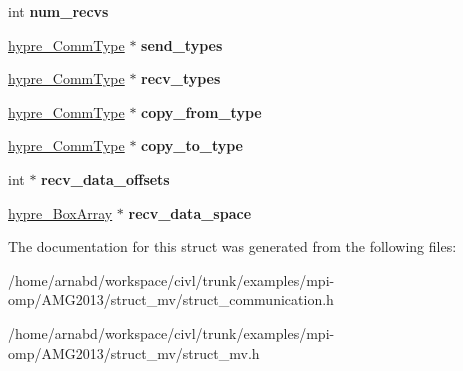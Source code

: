 \begin{DoxyCompactItemize}
\item 
\hypertarget{structhypre__CommPkg__struct_ad6ea2bee054ccc04654840324dd5136b}{}int {\bfseries num\+\_\+recvs}\label{structhypre__CommPkg__struct_ad6ea2bee054ccc04654840324dd5136b}

\item 
\hypertarget{structhypre__CommPkg__struct_a502ae18c7d9b6324891f60cf085dfe92}{}\hyperlink{structhypre__CommType__struct}{hypre\+\_\+\+Comm\+Type} $\ast$ {\bfseries send\+\_\+types}\label{structhypre__CommPkg__struct_a502ae18c7d9b6324891f60cf085dfe92}

\item 
\hypertarget{structhypre__CommPkg__struct_a1cf123ff7f70070ad42d258e8c6525ad}{}\hyperlink{structhypre__CommType__struct}{hypre\+\_\+\+Comm\+Type} $\ast$ {\bfseries recv\+\_\+types}\label{structhypre__CommPkg__struct_a1cf123ff7f70070ad42d258e8c6525ad}

\item 
\hypertarget{structhypre__CommPkg__struct_ad2a4994964bfb6b59caf59418ad10521}{}\hyperlink{structhypre__CommType__struct}{hypre\+\_\+\+Comm\+Type} $\ast$ {\bfseries copy\+\_\+from\+\_\+type}\label{structhypre__CommPkg__struct_ad2a4994964bfb6b59caf59418ad10521}

\item 
\hypertarget{structhypre__CommPkg__struct_af63c01b6c8c267ae6a28024355058869}{}\hyperlink{structhypre__CommType__struct}{hypre\+\_\+\+Comm\+Type} $\ast$ {\bfseries copy\+\_\+to\+\_\+type}\label{structhypre__CommPkg__struct_af63c01b6c8c267ae6a28024355058869}

\item 
\hypertarget{structhypre__CommPkg__struct_a4b8468a37cca38cd0172dea2f76fa22c}{}int $\ast$ {\bfseries recv\+\_\+data\+\_\+offsets}\label{structhypre__CommPkg__struct_a4b8468a37cca38cd0172dea2f76fa22c}

\item 
\hypertarget{structhypre__CommPkg__struct_ac61e7965e0ce364e91a5a47529a9942a}{}\hyperlink{structhypre__BoxArray__struct}{hypre\+\_\+\+Box\+Array} $\ast$ {\bfseries recv\+\_\+data\+\_\+space}\label{structhypre__CommPkg__struct_ac61e7965e0ce364e91a5a47529a9942a}

\end{DoxyCompactItemize}


The documentation for this struct was generated from the following files\+:\begin{DoxyCompactItemize}
\item 
/home/arnabd/workspace/civl/trunk/examples/mpi-\/omp/\+A\+M\+G2013/struct\+\_\+mv/struct\+\_\+communication.\+h\item 
/home/arnabd/workspace/civl/trunk/examples/mpi-\/omp/\+A\+M\+G2013/struct\+\_\+mv/struct\+\_\+mv.\+h\end{DoxyCompactItemize}
